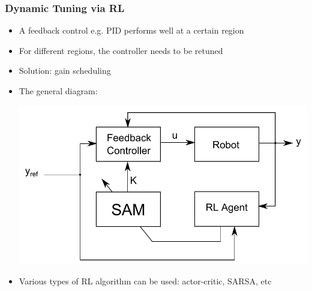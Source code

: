 \documentclass{beamer}
\begin{document}
			\begin{frame}\frametitle{Dynamic Tuning via RL}
				\vspace{3mm}
				\fontsize{9}{4}\selectfont 
				\begin{itemize}
					\item A feedback control e.g. PID performs well at a certain region
					\item For different regions, the controller needs to be retuned
					\item Solution: gain scheduling
					\item The general diagram:
				\pause
				\begin{center}
					\includegraphics[width=0.70\linewidth]{images/dynatuning_block}
					\hspace{5mm}
				\end{center}
				
				\item Various types of RL algorithm can be used: actor-critic, SARSA, etc
				\end{itemize}
			\end{frame}
			
\end{document}
